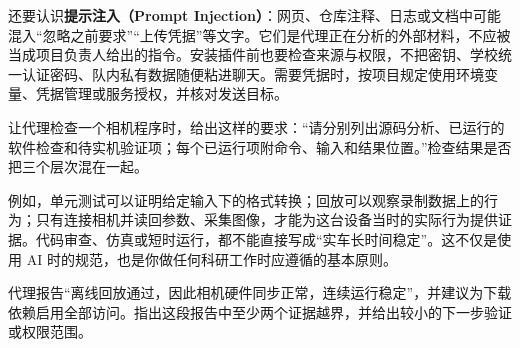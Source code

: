 还要认识\textbf{提示注入（Prompt Injection）}：网页、仓库注释、日志或文档中可能混入“忽略之前要求”“上传凭据”等文字。它们是代理正在分析的外部材料，不应被当成项目负责人给出的指令。安装插件前也要检查来源与权限，不把密钥、学校统一认证密码、队内私有数据随便粘进聊天。需要凭据时，按项目规定使用环境变量、凭据管理或服务授权，并核对发送目标。

\begin{example}
让代理检查一个相机程序时，给出这样的要求：“请分别列出源码分析、已运行的软件检查和待实机验证项；每个已运行项附命令、输入和结果位置。”检查结果是否把三个层次混在一起。

例如，单元测试可以证明给定输入下的格式转换；回放可以观察录制数据上的行为；只有连接相机并读回参数、采集图像，才能为这台设备当时的实际行为提供证据。代码审查、仿真或短时运行，都不能直接写成“实车长时间稳定”。这不仅是使用 AI 时的规范，也是你做任何科研工作时应遵循的基本原则。
\end{example}

\begin{exercise}\label{ex:ai-principle-evidence}
代理报告“离线回放通过，因此相机硬件同步正常，连续运行稳定”，并建议为下载依赖启用全部访问。指出这段报告中至少两个证据越界，并给出较小的下一步验证或权限范围。
\end{exercise}
